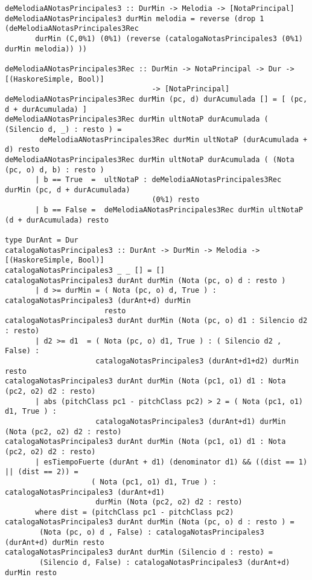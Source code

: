 \documentclass[a4paper]{report}
\begin{document}
\begin{verbatim}
deMelodiaANotasPrincipales3 :: DurMin -> Melodia -> [NotaPrincipal]
deMelodiaANotasPrincipales3 durMin melodia = reverse (drop 1 (deMelodiaANotasPrincipales3Rec 
       durMin (C,0%1) (0%1) (reverse (catalogaNotasPrincipales3 (0%1) durMin melodia)) ))

deMelodiaANotasPrincipales3Rec :: DurMin -> NotaPrincipal -> Dur -> [(HaskoreSimple, Bool)] 
                                  -> [NotaPrincipal]
deMelodiaANotasPrincipales3Rec durMin (pc, d) durAcumulada [] = [ (pc, d + durAcumulada) ]
deMelodiaANotasPrincipales3Rec durMin ultNotaP durAcumulada ( (Silencio d, _) : resto ) = 
        deMelodiaANotasPrincipales3Rec durMin ultNotaP (durAcumulada + d) resto
deMelodiaANotasPrincipales3Rec durMin ultNotaP durAcumulada ( (Nota (pc, o) d, b) : resto ) 
       | b == True  =  ultNotaP : deMelodiaANotasPrincipales3Rec durMin (pc, d + durAcumulada) 
                                  (0%1) resto
       | b == False =  deMelodiaANotasPrincipales3Rec durMin ultNotaP (d + durAcumulada) resto

type DurAnt = Dur 
catalogaNotasPrincipales3 :: DurAnt -> DurMin -> Melodia -> [(HaskoreSimple, Bool)]
catalogaNotasPrincipales3 _ _ [] = []
catalogaNotasPrincipales3 durAnt durMin (Nota (pc, o) d : resto )
       | d >= durMin = ( Nota (pc, o) d, True ) : catalogaNotasPrincipales3 (durAnt+d) durMin 
                       resto
catalogaNotasPrincipales3 durAnt durMin (Nota (pc, o) d1 : Silencio d2 : resto) 
       | d2 >= d1  = ( Nota (pc, o) d1, True ) : ( Silencio d2 , False) : 
                     catalogaNotasPrincipales3 (durAnt+d1+d2) durMin resto
catalogaNotasPrincipales3 durAnt durMin (Nota (pc1, o1) d1 : Nota (pc2, o2) d2 : resto)
       | abs (pitchClass pc1 - pitchClass pc2) > 2 = ( Nota (pc1, o1) d1, True ) : 
                     catalogaNotasPrincipales3 (durAnt+d1) durMin (Nota (pc2, o2) d2 : resto)
catalogaNotasPrincipales3 durAnt durMin (Nota (pc1, o1) d1 : Nota (pc2, o2) d2 : resto)
       | esTiempoFuerte (durAnt + d1) (denominator d1) && ((dist == 1) || (dist == 2)) = 
                    ( Nota (pc1, o1) d1, True ) : catalogaNotasPrincipales3 (durAnt+d1) 
                     durMin (Nota (pc2, o2) d2 : resto)
       where dist = (pitchClass pc1 - pitchClass pc2)
catalogaNotasPrincipales3 durAnt durMin (Nota (pc, o) d : resto ) = 
        (Nota (pc, o) d , False) : catalogaNotasPrincipales3 (durAnt+d) durMin resto
catalogaNotasPrincipales3 durAnt durMin (Silencio d : resto) = 
        (Silencio d, False) : catalogaNotasPrincipales3 (durAnt+d) durMin resto
\end{verbatim}
\end{document}

